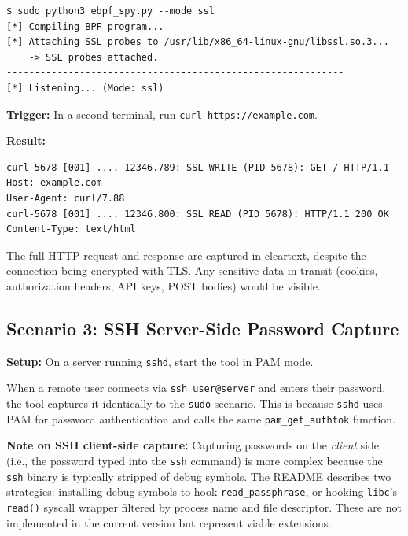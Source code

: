\documentclass[11pt,a4paper]{article}
\begin{document}
\begin{lstlisting}[style=shellstyle]
$ sudo python3 ebpf_spy.py --mode ssl
[*] Compiling BPF program...
[*] Attaching SSL probes to /usr/lib/x86_64-linux-gnu/libssl.so.3...
    -> SSL probes attached.
------------------------------------------------------------
[*] Listening... (Mode: ssl)
\end{lstlisting}

\textbf{Trigger:} In a second terminal, run \texttt{curl https://example.com}.

\textbf{Result:}
\begin{lstlisting}[style=shellstyle]
curl-5678 [001] .... 12346.789: SSL WRITE (PID 5678): GET / HTTP/1.1
Host: example.com
User-Agent: curl/7.88
curl-5678 [001] .... 12346.800: SSL READ (PID 5678): HTTP/1.1 200 OK
Content-Type: text/html
\end{lstlisting}

The full HTTP request and response are captured in cleartext, despite the
connection being encrypted with TLS. Any sensitive data in transit (cookies,
authorization headers, API keys, POST bodies) would be visible.

\subsection{Scenario 3: SSH Server-Side Password Capture}
\label{subsec:demo_ssh}

\textbf{Setup:} On a server running \texttt{sshd}, start the tool in PAM mode.

When a remote user connects via \texttt{ssh user@server} and enters their
password, the tool captures it identically to the \texttt{sudo} scenario.
This is because \texttt{sshd} uses PAM for password authentication and calls
the same \texttt{pam\_get\_authtok} function.

\textbf{Note on SSH client-side capture:} Capturing passwords on the
\textit{client} side (i.e., the password typed into the \texttt{ssh} command)
is more complex because the \texttt{ssh} binary is typically stripped of debug
symbols. The README describes two strategies: installing debug symbols to hook
\texttt{read\_passphrase}, or hooking \texttt{libc}'s \texttt{read()} syscall
wrapper filtered by process name and file descriptor. These are not implemented
in the current version but represent viable extensions.
\end{document}

